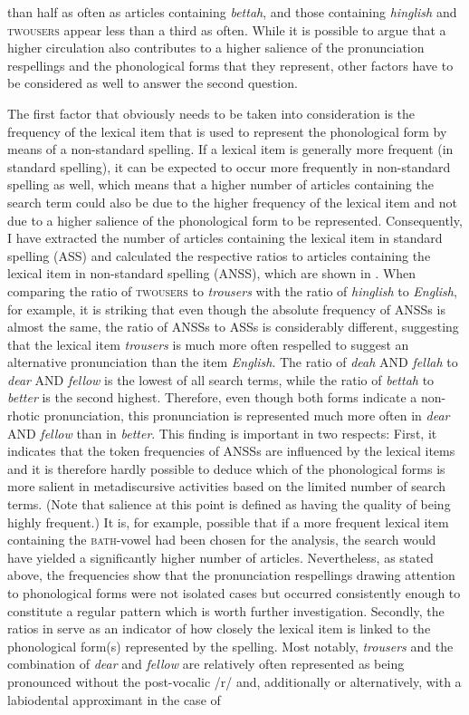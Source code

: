 than half as often as articles containing \emph{bettah}, and those containing \emph{hinglish} and \textsc{twousers} appear less than a third as often. While it is possible to argue that a higher circulation also contributes to a higher salience of the pronunciation respellings and the phonological forms that they represent, other factors have to be considered as well to answer the second question.


The first factor that obviously needs to be taken into consideration is the frequency of the lexical item that is used to represent the phonological form by means of a non-standard spelling. If a lexical item is generally more frequent (in standard spelling), it can be expected to occur more frequently in non-standard spelling as well, which means that a higher number of articles containing the search term could also be due to the higher frequency of the lexical item and not due to a higher salience of the phonological form to be represented. Consequently, I have extracted the number of articles containing the lexical item in standard spelling (ASS) and calculated the respective ratios to articles containing the lexical item in non-standard spelling (ANSS), which are shown in . When comparing the ratio of \textsc{twousers} to \emph{trousers} with the ratio of \emph{hinglish} to \emph{English}, for example, it is striking that even though the absolute frequency of ANSSs is almost the same, the ratio of ANSSs to ASSs is considerably different, suggesting that the lexical item \emph{trousers} is much more often respelled to suggest an alternative pronunciation than the item \emph{English}. The ratio of \emph{deah} AND \emph{fellah} to \emph{dear} AND \emph{fellow} is the lowest of all search terms, while the ratio of \emph{bettah} to \emph{better} is the second highest. Therefore, even though both forms indicate a non-rhotic pronunciation, this pronunciation is represented much more often in \emph{dear} AND \emph{fellow} than in \emph{better}. This finding is important in two respects: First, it indicates that the token frequencies of ANSSs are influenced by the lexical items and it is therefore hardly possible to deduce which of the phonological forms is more salient in metadiscursive activities based on the limited number of search terms. (Note that salience at this point is defined as having the quality of being highly frequent.) It is, for example, possible that if a more frequent lexical item containing the \textsc{bath}{}-vowel had been chosen for the analysis, the search would have yielded a significantly higher number of articles. Nevertheless, as stated above, the frequencies show that the pronunciation respellings drawing attention to phonological forms were not isolated cases but occurred consistently enough to constitute a regular pattern which is worth further investigation. Secondly, the ratios in  serve as an indicator of how closely the lexical item is linked to the phonological form(s) represented by the spelling. Most notably, \emph{trousers} and the combination of \emph{dear} and \emph{fellow} are relatively often represented as being pronounced without the post-vocalic /r/ and, additionally or alternatively, with a labiodental approximant in the case of 